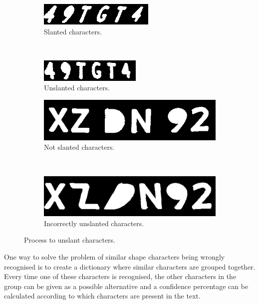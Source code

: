 \begin{figure}[ht]
        \centering
        \begin{subfigure}{0.33\textwidth}
            \includegraphics[width=\textwidth]{plaatjes/slanted-plate}
            \caption{Slanted characters.}
            \label{fig:slanted-plate}
        \end{subfigure}%
        ~ 
        \begin{subfigure}{0.33\textwidth}
            \includegraphics[width=\textwidth]{plaatjes/unslanted-plate}
            \caption{Unslanted characters.}
            \label{fig:unslanted-plate}
        \end{subfigure}%

        \begin{subfigure}{0.33\textwidth}
            \includegraphics[width=\textwidth]{plaatjes/plate-no-slant}
            \caption{Not slanted characters.}
            \label{fig:not-slanted-plate}
        \end{subfigure}%
        ~ 
        \begin{subfigure}{0.33\textwidth}
            \includegraphics[width=\textwidth]{plaatjes/unslanted-incorrectly}
            \caption{Incorrectly unslanted characters.}
            \label{fig:incorrectly-unslanted-plate}
        \end{subfigure}%

        \caption{Process to unslant characters.}
        \label{fig:unslanting-plate}
\end{figure}


One way to solve the problem of similar shape characters being wrongly recognised is to create a dictionary where similar characters are grouped together. Every time one of these characters is recognised, the other characters in the group can be given as a possible alternative and a confidence percentage can be calculated according to which characters are present in the text.
